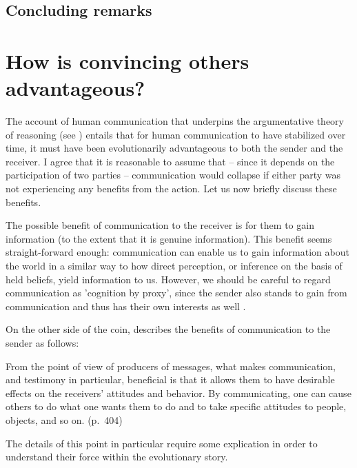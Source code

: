 \subsection{Concluding remarks}


\section{How is convincing others advantageous?}


The account of human communication that underpins the argumentative theory of reasoning (see \citet{Sperber01, Sperber10})
entails that for human communication to have stabilized over time, it must have been evolutionarily advantageous to both the sender and the receiver. I agree that it is reasonable to assume that -- since it depends on the participation of two parties -- communication would collapse if either party was not experiencing any benefits from the action. Let us now briefly discuss these benefits.

The possible benefit of communication to the receiver is for them to gain information (to the extent that it is genuine information).
This benefit seems straight-forward enough: communication can enable us to gain information about the world in a similar way to how direct perception, or inference on the basis of held beliefs, yield information to us. However, we should be careful to regard communication as 'cognition by proxy', since the sender also stands to gain from communication and thus has their own interests as well \citep{Sperber01}.

On the other side of the coin, \citet{Sperber01} describes the benefits of communication to the sender as follows:
\begin{quoting}
    From the point of view of producers of messages, what makes communication, and testimony in particular, beneficial is that it allows them to have desirable effects on the receivers' attitudes and behavior. By communicating, one can cause others to do what one wants them to do and to take specific attitudes to people, objects, and so on.
    \hfill (p.~404)
\end{quoting}
The details of this point in particular require some explication in order to understand their force within the evolutionary story.

